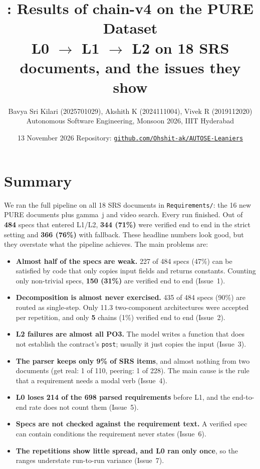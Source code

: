 \documentclass[10pt,a4paper]{article}
\title{\vspace{-1.3cm}\textbf{\cf: Results of chain-v4 on the PURE Dataset}\\[2pt]
\large L0 $\rightarrow$ L1 $\rightarrow$ L2 on 18 SRS documents, and the issues they show}
\author{Bavya Sri Kilari (2025701029), Akshith K (2024111004), Vivek R (2019112020)\\
\small Autonomous Software Engineering, Monsoon 2026, IIIT Hyderabad}
\date{\small 13 November 2026 \quad Repository: \href{https://github.com/Ohshit-ak/AUTOSE-Leaniers}{\nolinkurl{github.com/Ohshit-ak/AUTOSE-Leaniers}}}
\newcommand{\code}[1]{\texttt{\small #1}}
\begin{document}
\maketitle
\vspace{-0.9cm}

\section{Summary}
We ran the full pipeline on all 18 SRS documents in \code{Requirements/}: the 16 new PURE documents plus gamma~j and video search.
Every run finished. Out of \textbf{484} specs that entered L1/L2, \textbf{344 (71\%)} were verified end to end in the
strict setting and \textbf{366 (76\%)} with fallback. These headline numbers look good, but they overstate what the pipeline
achieves. The main problems are:
\begin{itemize}
\item \textbf{Almost half of the specs are weak.} 227 of 484 specs (47\%) can be satisfied by code that only copies input
      fields and returns constants. Counting only non-trivial specs, \textbf{150 (31\%)} are verified end to end (Issue~1).
\item \textbf{Decomposition is almost never exercised.} 435 of 484 specs (90\%) are routed as single-step. Only 11.3
      two-component architectures were accepted per repetition, and only \textbf{5} chains (1\%) verified end to end (Issue~2).
\item \textbf{L2 failures are almost all PO3.} The model writes a function that does not establish the contract's \code{post};
      usually it just copies the input (Issue~3).
\item \textbf{The parser keeps only 9\% of SRS items}, and almost nothing from two documents (get real: 1 of 110,
      peering: 1 of 228). The main cause is the rule that a requirement needs a modal verb (Issue~4).
\item \textbf{L0 loses 214 of the 698 parsed requirements} before L1, and the end-to-end rate does not count them (Issue~5).
\item \textbf{Specs are not checked against the requirement text.} A verified spec can contain conditions the requirement
      never states (Issue~6).
\item \textbf{The repetitions show little spread, and L0 ran only once}, so the ranges understate run-to-run variance (Issue~7).
\end{itemize}
\end{document}
